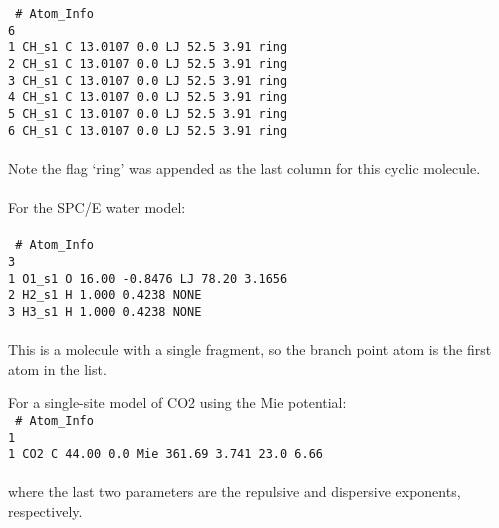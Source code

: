 %
\texttt{
\# Atom\_Info \\
6\\
1    CH\_s1    C    13.0107    0.0    LJ    52.5    3.91 ring\\
2    CH\_s1    C    13.0107    0.0    LJ    52.5    3.91 ring\\
3    CH\_s1    C    13.0107    0.0    LJ    52.5    3.91 ring\\
4    CH\_s1    C    13.0107    0.0    LJ    52.5    3.91 ring\\
5    CH\_s1    C    13.0107    0.0    LJ    52.5    3.91 ring\\
6    CH\_s1    C    13.0107    0.0    LJ    52.5    3.91 ring\\
}
\\
%
Note the flag `ring' was appended as the last column for this cyclic molecule. \\ \\
%
For the SPC/E water model:  \\ \\
%
\texttt{
\# Atom\_Info\\
3\\
1    O1\_s1    O    16.00     -0.8476    LJ    78.20   3.1656\\
2    H2\_s1    H    1.000      0.4238    NONE\\
3    H3\_s1    H    1.000      0.4238    NONE\\
} \\
%
This is a molecule with a single fragment, so the branch point atom is the first atom in the list.

For a single-site model of CO2 using the Mie potential:
\\
\texttt{
\# Atom\_Info\\
1\\
1    CO2       C    44.00      0.0       Mie  361.69   3.741   23.0   6.66\\
} \\
where the last two parameters are the repulsive and dispersive exponents, respectively.

